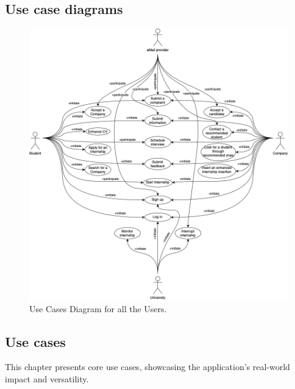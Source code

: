\subsection{Use case diagrams}
\label{subsec:use_case_diagrams}%


\begin{figure}[H]
    \begin{center}
        \includegraphics[width=\linewidth]{Images/UCDiagram.png}
        \caption{Use Cases Diagram for all the Users.} 
        \label{fig:UnregisteredUC}%
        \end{center}
\end{figure}

\newpage

\subsection{Use cases}
\label{subsec: use_cases}%
\setcounter{uc}{1}
\newcommand{\cuc}{\theuc\stepcounter{uc}}

This chapter presents core use cases, showcasing the application's real-world impact and versatility.

